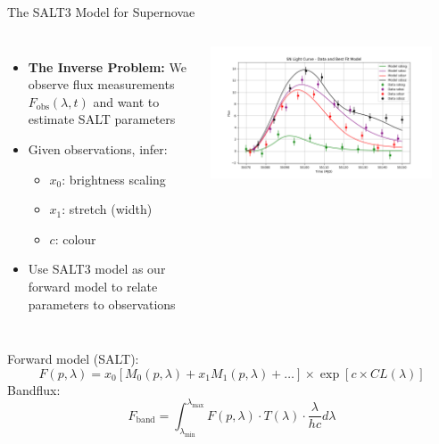 \documentclass[aspectratio=169]{beamer}
\begin{document}
\begin{frame}{The SALT3 Model for Supernovae}
  \begin{columns}
      \small
      \begin{itemize}
        \item \textbf{The Inverse Problem:} We observe flux measurements $F_{\text{obs}}(\lambda, t)$ and want to estimate SALT parameters
        \item Given observations, infer:
          \begin{itemize}
            \item $x_0$: brightness scaling
            \item $x_1$: stretch (width)
            \item $c$: colour
          \end{itemize}
        \item Use SALT3 model as our forward model to relate parameters to observations
      \end{itemize}
      \centering
      \includegraphics[width=0.9\textwidth]{images/sncosmo-fitter.png}
  \end{columns}
  \vfill
  \centering
  \footnotesize
  Forward model (SALT):
  \begin{equation*}
    F(p, \lambda) = x_0 \left[M_0(p, \lambda) + x_1M_1(p, \lambda) + \dots\right] \times \exp \left[c \times CL(\lambda)\right]
  \end{equation*}
  Bandflux:
  \begin{equation*}
    F_{\text{band}} = \int_{\lambda_{\text{min}}}^{\lambda_{\text{max}}} F(p, \lambda) \cdot T(\lambda) \cdot \frac{\lambda}{hc} d\lambda
  \end{equation*}
\end{frame}
\end{document}
